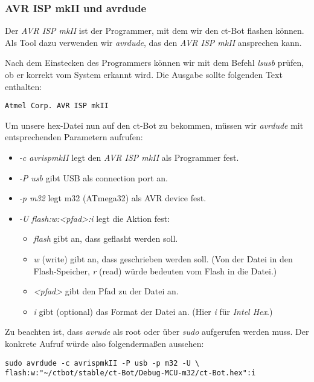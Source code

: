 \subsubsection{AVR ISP mkII und avrdude}
Der \textit{AVR ISP mkII} ist der Programmer, mit dem wir den ct-Bot flashen können. Als Tool dazu verwenden wir \textit{avrdude}, das den \textit{AVR ISP mkII} ansprechen kann.

Nach dem Einstecken des Programmers können wir mit dem Befehl \textit{lsusb} prüfen, ob er korrekt vom System erkannt wird. Die Ausgabe sollte folgenden Text enthalten:
\begin{lstlisting}
Atmel Corp. AVR ISP mkII
\end{lstlisting}

Um unsere hex-Datei nun auf den ct-Bot zu bekommen, müssen wir \textit{avrdude} mit entsprechenden Parametern aufrufen:
\begin{itemize}
\item \textit{-c avrispmkII} legt den \textit{AVR ISP mkII} als Programmer fest.
\item \textit{-P usb} gibt USB als connection port an.
\item \textit{-p m32} legt m32 (ATmega32) als AVR device fest.
\item \textit{-U flash:w:<pfad>:i} legt die Aktion fest:
	\begin{itemize}
	\item \textit{flash} gibt an, dass geflasht werden soll.
	\item \textit{w} (write) gibt an, dass geschrieben werden soll. (Von der Datei in den Flash-Speicher, \textit{r} (read) würde bedeuten vom Flash in die Datei.)
	\item \textit{<pfad>} gibt den Pfad zu der Datei an.
	\item \textit{i} gibt (optional) das Format der Datei an. (Hier \textit{i} für \textit{Intel Hex}.)
	\end{itemize}
\end{itemize}
Zu beachten ist, dass \textit{avrude} als root oder über \textit{sudo} aufgerufen werden muss.
Der konkrete Aufruf würde also folgendermaßen aussehen:
\begin{lstlisting}
sudo avrdude -c avrispmkII -P usb -p m32 -U \
flash:w:"~/ctbot/stable/ct-Bot/Debug-MCU-m32/ct-Bot.hex":i
\end{lstlisting}
